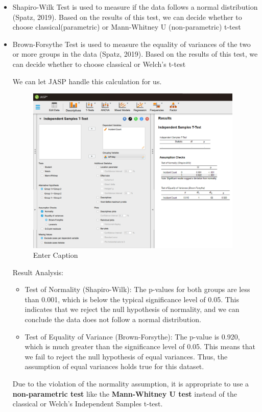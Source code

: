 \documentclass{article}
\begin{document}
\begin{itemize}
    \item Shapiro-Wilk Test is used to measure if the data follows a normal distribution (Spatz, 2019). Based on the results of this test, we can decide whether to choose classical(parametric) or Mann-Whitney U (non-parametric) t-test

    \item Brown-Forsythe Test is used to measure the equality of variances of the two or more groups in the data (Spatz, 2019). Based on the results of this test, we can decide whether to choose classical or Welch's t-test
    
    We can let JASP handle this calculation for us.

    \begin{figure}[H]
        \centering
        \includegraphics[width=0.7\linewidth, height=8cm]{Screenshot 2024-09-27 230725.png}
        \caption{Enter Caption}
        \label{fig:enter-label}
    \end{figure}

    Result Analysis:

    \begin{itemize}
        \item Test of Normality (Shapiro-Wilk): The p-values for both groups are less than 0.001, which is below the typical significance level of 0.05. This indicates that we reject the null hypothesis of normality, and we can conclude the data does not follow a normal distribution.

        \item Test of Equality of Variance (Brown-Forsythe): The p-value is 0.920, which is much greater than the significance level of 0.05. This means that we fail to reject the null hypothesis of equal variances. Thus, the assumption of equal variances holds true for this dataset.
    \end{itemize}

    Due to the violation of the normality assumption, it is appropriate to use a \textbf{non-parametric test} like the\textbf{ Mann-Whitney U test} instead of the classical or Welch's Independent Samples t-test.
    
\end{itemize}
\end{document}
